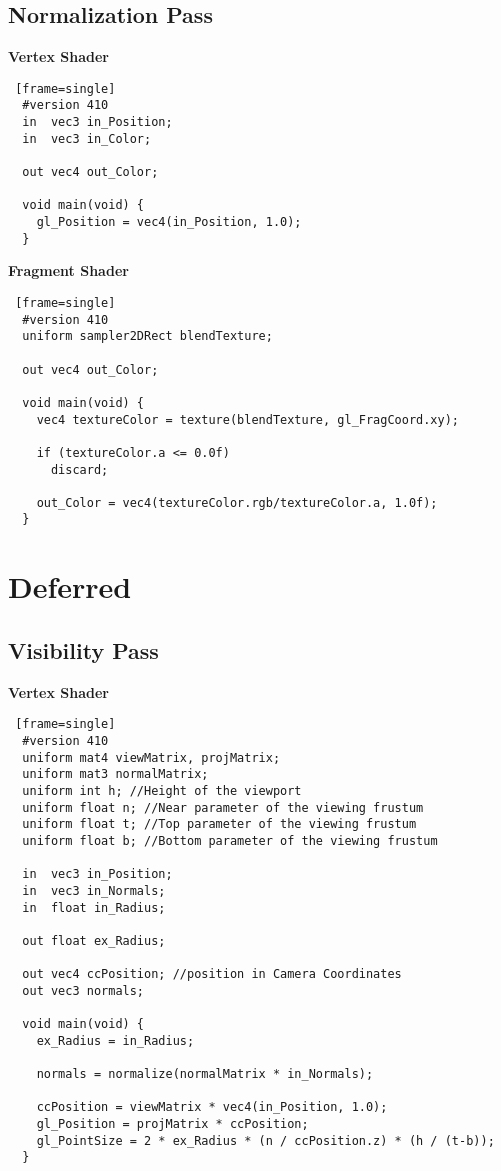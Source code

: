 \subsection{Normalization Pass}
\textbf{Vertex Shader}
\begin{lstlisting} [frame=single]
  #version 410
  in  vec3 in_Position;
  in  vec3 in_Color;

  out vec4 out_Color;

  void main(void) {
    gl_Position = vec4(in_Position, 1.0);
  }
\end{lstlisting}

\textbf{Fragment Shader}
\begin{lstlisting} [frame=single]
  #version 410
  uniform sampler2DRect blendTexture;

  out vec4 out_Color;

  void main(void) {
    vec4 textureColor = texture(blendTexture, gl_FragCoord.xy);

    if (textureColor.a <= 0.0f)
      discard;

    out_Color = vec4(textureColor.rgb/textureColor.a, 1.0f);
  }
\end{lstlisting}
\newpage

\section{Deferred \label{deferred}}
\subsection{Visibility Pass}
\textbf{Vertex Shader}
\begin{lstlisting} [frame=single]
  #version 410
  uniform mat4 viewMatrix, projMatrix;
  uniform mat3 normalMatrix;
  uniform int h; //Height of the viewport
  uniform float n; //Near parameter of the viewing frustum
  uniform float t; //Top parameter of the viewing frustum
  uniform float b; //Bottom parameter of the viewing frustum

  in  vec3 in_Position;
  in  vec3 in_Normals;
  in  float in_Radius;

  out float ex_Radius;

  out vec4 ccPosition; //position in Camera Coordinates
  out vec3 normals;

  void main(void) {
    ex_Radius = in_Radius;

    normals = normalize(normalMatrix * in_Normals);

    ccPosition = viewMatrix * vec4(in_Position, 1.0);
    gl_Position = projMatrix * ccPosition;
    gl_PointSize = 2 * ex_Radius * (n / ccPosition.z) * (h / (t-b));
  }
\end{lstlisting}
\newpage


